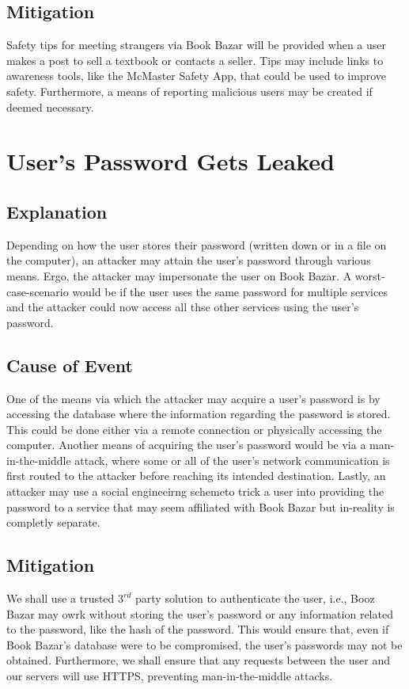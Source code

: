 \documentclass[fullpage]{article}
\begin{document}
\subsection*{Mitigation}
Safety tips for meeting strangers via Book Bazar will be provided when a user makes a post to sell a textbook or contacts a seller. Tips may include links to awareness tools, like the McMaster Safety App, that could be used to improve safety. Furthermore, a means of reporting malicious users may be created if deemed necessary.

\section{User's Password Gets Leaked}

\subsection*{Explanation}
Depending on how the user stores their password (written down or in a file on the computer), an attacker may attain the user's password through various means. Ergo, the attacker may impersonate the user on Book Bazar. A worst-case-scenario would be if the user uses the same password for multiple services and the attacker could now access all thse other services using the user's password. 

\subsection*{Cause of Event}
One of the means via which the attacker may acquire a user's password is by accessing the database where the information regarding the password is stored. This could be done either via a remote connection or physically accessing the computer. Another means of acquiring the user's password would be  via a man-in-the-middle attack, where some or all of the user's network communication is first routed to the attacker before reaching its intended destination. Lastly, an attacker may use a social engineeirng schemeto trick a user into providing the password to a service that may seem affiliated with Book Bazar but in-reality is completly separate.

\subsection*{Mitigation}
We shall use a trusted $3^{rd}$ party solution to authenticate the user, i.e., Booz Bazar may owrk without storing the user's password or any information related to the password, like the hash of the password. This would ensure that, even if Book Bazar's database were to be compromised, the user's passwords may not be obtained. Furthermore, we shall ensure that any requests between the user and our servers will use HTTPS, preventing man-in-the-middle attacks.
\end{document}
